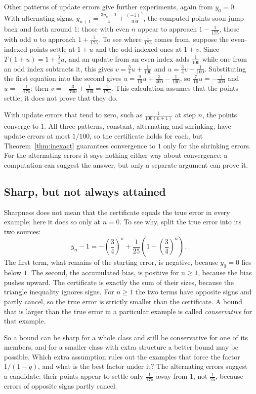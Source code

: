 Other patterns of update errors give further experiments, again from $y_0=0$. With alternating signs, $y_{n+1}=\frac{3y_n+1}{4}+\frac{(-1)^n}{100}$, the computed points soon jump back and forth around $1$: those with even $n$ appear to approach $1-\frac1{175}$, those with odd $n$ to approach $1+\frac1{175}$. To see where $\frac1{175}$ comes from, suppose the even-indexed points settle at $1+u$ and the odd-indexed ones at $1+v$. Since $T(1+u)=1+\frac34u$, and an update from an even index adds $\frac1{100}$ while one from an odd index subtracts it, this gives $v=\frac34u+\frac1{100}$ and $u=\frac34v-\frac1{100}$. Substituting the first equation into the second gives $u=\frac9{16}u+\frac3{400}-\frac1{100}$, so $\frac7{16}u=-\frac1{400}$ and $u=-\frac1{175}$; then $v=-\frac3{700}+\frac1{100}=\frac1{175}$. This calculation assumes that the points settle; it does not prove that they do.

With update errors that tend to zero, such as $\frac1{100(n+1)}$ at step $n$, the points converge to $1$. All three patterns, constant, alternating and shrinking, have update errors at most $1/100$, so the certificate holds for each, but Theorem~\ref{thm:inexact} guarantees convergence to $1$ only for the shrinking errors. For the alternating errors it says nothing either way about convergence: a computation can suggest the answer, but only a separate argument can prove it.

\subsection*{Sharp, but not always attained}
Sharpness does not mean that the certificate equals the true error in every example; here it does so only at $n=0$. To see why, split the true error into its two sources:
\[
 y_n-1=-\left(\frac34\right)^n+\frac1{25}\left(1-\left(\frac34\right)^n\right).
\]
The first term, what remains of the starting error, is negative, because $y_0=0$ lies below $1$. The second, the accumulated bias, is positive for $n\ge1$, because the bias pushes upward. The certificate is exactly the sum of their sizes, because the triangle inequality ignores signs. For $n\ge1$ the two terms have opposite signs and partly cancel, so the true error is strictly smaller than the certificate. A bound that is larger than the true error in a particular example is called \emph{conservative} for that example.

So a bound can be sharp for a whole class and still be conservative for one of its members, and for a smaller class with extra structure a better bound may be possible. Which extra assumption rules out the examples that force the factor $1/(1-q)$, and what is the best factor under it? The alternating errors suggest a candidate: their points appear to settle only $\frac1{175}$ away from $1$, not $\frac1{25}$, because errors of opposite signs partly cancel.

